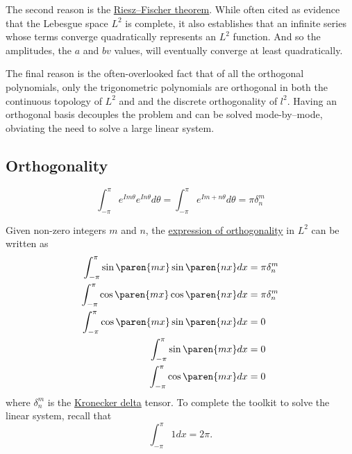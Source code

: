 The second reason is the \href{https://en.wikipedia.org/wiki/Riesz–Fischer_theorem}{Riesz–Fischer theorem}. While often cited as evidence that the Lebesgue space $L^{2}$ is complete, it also establishes that an infinite series whose terms converge quadratically represents an $L^{2}$ function. And so the amplitudes, the $a$ and $bv$ values, will eventually converge at least quadratically.

The final reason is the often-overlooked fact that of all the orthogonal polynomials, only the trigonometric polynomials are orthogonal in both the continuous topology of $L^{2}$ and and the discrete orthogonality of $l^{2}$. Having an orthogonal basis decouples the problem and can be solved mode-by--mode, obviating the need to solve a large linear system.

\subsection{Orthogonality}
\begin{equation}
	\int_{-\pi}^{\pi} e^{I m \theta} e^{I n \theta} d\theta = \int_{-\pi}^{\pi} e^{I m + n \theta} d\theta = \pi \delta^{m}_{n}
\end{equation}

Given non-zero integers $m$ and $n$, the \href{https://mathworld.wolfram.com/FourierSeries.html}{expression of orthogonality} in $L^{2}$ can be written as
\begin{equation}
	\begin{split}
		\int_{-\pi}^{\pi} \sin \paren{mx} \sin \paren{nx}dx &= \pi \delta^{m}_{n}\\
		\int_{-\pi}^{\pi} \cos \paren{mx} \cos \paren{nx} dx &= \pi \delta^{m}_{n}\\
		\int_{-\pi}^{\pi} \cos \paren{mx} \sin \paren{nx} dx &= 0\\
		\int_{-\pi}^{\pi} \sin \paren{mx} dx &= 0\\
		\int_{-\pi}^{\pi} \cos \paren{mx}dx &= 0\\
	\end{split}
\label{eq:orthogonality}
\end{equation}
%
where $\delta^{m}_{n}$ is the \href{https://mathworld.wolfram.com/KroneckerDelta.html}{Kronecker delta} tensor. To complete the toolkit to solve the linear system, recall that
\begin{equation}
	\int_{-\pi}^{\pi} 1 dx = 2\pi.
\end{equation}


